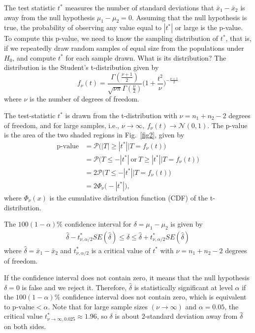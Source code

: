 \documentclass[10pt, aps,twocolumn, superscriptaddress, nofootinbib]{revtex4-2}
\begin{document}
The test statistic $t^*$ measures the number of standard deviations that $\bar{x}_1-\bar{x}_2$ is away from the null hypothesis $\mu_1-\mu_2 = 0$.  Assuming that the null hypothesis is true, the probability of observing any value equal to $|t^*|$ or large is the p-value. To compute this p-value, we need to know the sampling distribution of $t^*$,  that is, if we repeatedly draw random samples of equal size from the populations under $H_0$, and compute $t^*$ for each sample drawn.  What is its distribution?   The distribution is the Student's t-distribution  given by \cite{s3a,s3s}
 \begin{equation}
 f_\nu(t) = \frac{\Gamma\left(\frac{\nu+1}{2}\right) }{\sqrt{\nu\pi}\Gamma\left(\frac{\nu}{2}\right)}\Big( 1+\frac{t^2}{\nu}\Big)^{-\frac{\nu +1}{2}}
  \end{equation}
where $\nu$  is the number of degrees of freedom.

The test-statistic  $t^*$ is drawn from the t-distribution with $\nu=n_1+n_2-2$ degrees of freedom, and for large samples, i.e., $\nu\to \infty,~f_\nu(t)\to \mathcal{N}(0,1)$.  The p-value is the area of the two shaded regions in Fig.~\eqref{fig2}, given by
 \begin{align}
 \text{p-value} &= \mathcal{P}\Big(|T| \geq |t^*| \Big\vert T = f_\nu(t) \Big) \nonumber\\&
 = \mathcal{P}\Big(T \leq -|t^*|~\text{or}~T \geq |t^*| \Big\vert T = f_\nu(t) \Big)\nonumber \\&
 = 2\mathcal{P}\Big(T \leq -|t^*|  \Big\vert T = f_\nu(t)\Big) \nonumber \\&= 2{\Phi}_\nu\big(-|t^*|\big),
   \end{align}
 where ${\Phi}_\nu(x)$  is the cumulative distribution function (CDF) of the t-distribution.
 
 The $100(1-\alpha)\%$ confidence interval for $\delta = \mu_1-\mu_2$ is given by
\begin{align}
 \hat{\delta} - t^*_{\nu, \alpha/2}SE(\hat{\delta} ) \leq \delta  \leq\hat{\delta}  + t^*_{\nu, \alpha/2}SE(\hat{\delta} )
 \end{align}
where $\hat{\delta}  = \bar{x}_1-\bar{x}_2$ and $ t^*_{\nu, \alpha/2}$   is a critical value of $t^*$ with $\nu =n_1+n_2-2$ degrees of freedom. 

If the confidence interval does not contain zero, it means that the null hypothesis $\delta =0$ is false and we reject it. Therefore, $\hat{\delta}$ is statistically significant at level $\alpha$ if the $100(1-\alpha)\%$ confidence interval  does not contain zero, which is equivalent to $\text{p-value} < \alpha$. Note that for large sample sizes $(\nu \to \infty)$ and $\alpha =0.05$, the critical value  $ t^*_{\nu \to \infty, 0.025}\approx 1.96$, so $\delta$ is about 2-standard deviation away from $\hat{\delta}$ on both sides.
\end{document}
